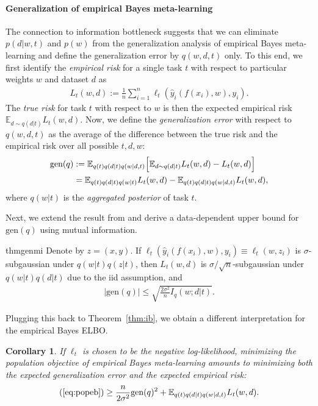 \documentclass{article} \usepackage{iclr2020_conference,times}
\def\eqref#1{(\ref{#1})}
\newcommand{\E}{\mathbb{E}}
\newtheorem{coro}{Corollary}
\newcommand{\nt}{n}
\begin{document}
\paragraph{Generalization of empirical Bayes meta-learning}
    The connection to information bottleneck suggests that we can eliminate $p(d|w,t)$ and $p(w)$ from 
    the generalization analysis of empirical Bayes meta-learning and define the generalization error by $q(w, d, t)$ only.
    To this end, we first identify the \emph{empirical risk} for a single task $t$ with respect to particular weights $w$ and dataset $d$ as 
\begin{align}
L_t(w, d) := \frac{1}{\nt} \sum_{i=1}^{\nt} \ell_t(\hat{y}_i(f(x_i),w), y_i).
\end{align}
    The \emph{true risk} for task $t$ with respect to $w$ is then the expected empirical risk $\E_{d \sim q(d | t)} L_t(w, d)$.
    Now, we define the \emph{generalization error} with respect to $q(w, d, t)$ as 
    the average of the difference between the true risk and the empirical risk over all possible $t, d, w$:
\begin{align}
    \text{gen}(q) &:= 
    \E_{q(t) q(d|t) q(w|d,t)} \Big[ \E_{d \sim q(d | t)} L_t(w, d) - L_t(w, d) \Big] \notag \\
    &=  \E_{q(t) q(d|t) q(w|t)} L_t(w, d) -  \E_{q(t) q(d|t) q(w|d,t)} L_t(w, d),
\end{align}
where $q(w|t)$ is the \emph{aggregated posterior} of task $t$.

Next, we extend the result from \citet{xu2017information} and derive a data-dependent upper bound for $\text{gen}(q)$ using mutual information.
\begin{restatable*}{thm}{genmi}
    Denote by $z = (x, y)$.
    If $\ell_t(\hat{y}_i(f(x_i),w), y_i) \equiv \ell_t(w, z_i)$ is $\sigma$-subgaussian under $q(w|t)q(z|t)$, 
then $L_t(w, d)$ is $\sigma/\sqrt{n}$-subgaussian under $q(w|t)q(d|t)$ due to the iid assumption, and
    \begin{align}
        \big| \text{gen}(q) \big| \leq \sqrt{\frac{2\sigma^2}{n} I_q(w; d | t)}.
    \end{align}
\end{restatable*}

Plugging this back to Theorem~\ref{thm:ib}, we obtain a different interpretation for the empirical Bayes ELBO.

\begin{coro}
    \label{thm:gen}
    If $\ell_t$ is chosen to be the negative log-likelihood, minimizing the population objective of empirical Bayes meta-learning
    amounts to minimizing both the expected generalization error and the expected empirical risk:
    \begin{align}
\eqref{eq:popeb} \geq \frac{n}{2\sigma^2} \text{gen}(q)^2 + \E_{q(t) q(d|t) q(w|d,t)} L_t(w, d).
    \end{align}
\end{coro}
\end{document}
